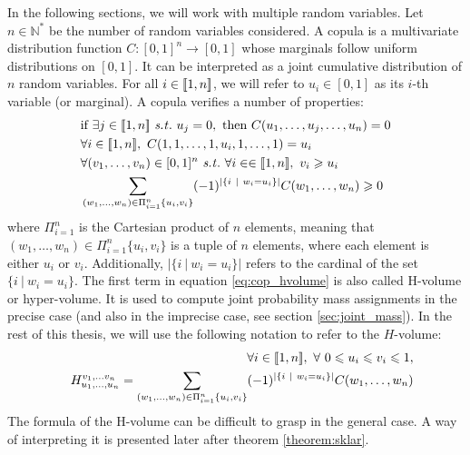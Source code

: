 In the following sections, we will work with multiple random variables. Let $n\in\mathbb{N}^*$ be the number of random variables considered. A copula is a multivariate distribution function $C:[0,1]^{n}\rightarrow [0,1]$ whose marginals follow uniform distributions on $[0,1]$. It can be interpreted as a joint cumulative distribution of $n$ random variables. For all $i\in{[\![} 1,n{]\!]} $, we will refer to $u_i\in[0,1]$ as its $i$-th variable (or marginal). A copula verifies a number of properties:
\begin{align}
    &\text{if }\exists j\in\opi 1,n\cli  \text{ \st }~u_j=0, \text{ then }C(u_1,\dots,u_j,\dots,u_n)=0\label{eq:zero_copula}\\
    &\forall i\in\opi 1,n\cli ,~C(1,1,\dots,1,u_i,1,\dots,1)=u_i\label{eq:copula_ones}\\
    &\forall (v_1,\dots,v_n)\in[0,1]^n \text{ \st }~\forall i\in\in\opi 1,n\cli ,~v_i\geqslant u_i\nonumber\\
    &\sum_{(w_1, \dots, w_n)\in\Pi_{i=1}^n\{u_i, v_i\}}(-1)^{|\{i~|~w_i=u_i\}|}C(w_1, \dots, w_n)\geqslant 0\label{eq:cop_hvolume}
\end{align}
where $\Pi_{i=1}^n$ is the Cartesian product of $n$ elements, meaning that $(w_1, \dots, w_n)\in\Pi_{i=1}^n\{u_i, v_i\}$ is a tuple of $n$ elements, where each element is either $u_i$ or $v_i$. Additionally, $|\{i~|~w_i=u_i\}|$ refers to the cardinal of the set $\{i~|~w_i=u_i\}$. The first term in equation \eqref{eq:cop_hvolume} is also called H-volume or hyper-volume. It is used to compute joint probability mass assignments in the precise case (and also in the imprecise case, see section \ref{sec:joint_mass}). In the rest of this thesis, we will use the following notation to refer to the $H$-volume:
\begin{eqnarray}\label{eq:hvolume}
    &&\forall i\in{[\![} 1,n{]\!]} ,~\forall~0\leqslant u_i \leqslant v_i \leqslant 1,\nonumber\\
    &&H^{v_1,\dots v_n}_{u_1,\dots,u_n}=\sum_{(w_1, \dots, w_n)\in\Pi_{i=1}^n\{u_i, v_i\}}(-1)^{|\{i~|~w_i=u_i\}|}C(w_1, \dots, w_n)
\end{eqnarray}
The formula of the H-volume can be difficult to grasp in the general case. A way of interpreting it is presented later after theorem \ref{theorem:sklar}.

